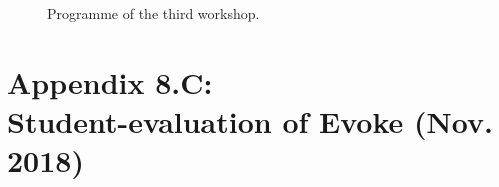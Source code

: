 \begin{figure}[htbp!]
\centering
{}
\caption{\label{fig:app:8.B:w3-programme}Programme of the third workshop.}
\end{figure}

\newpage
\section*{Appendix 8.C:\\Student-evaluation of Evoke (Nov. 2018)}
\label{Appendix8.C}

\begingroup
\renewcommand{\thefigure}{8.C.\arabic{figure}}
\setcounter{figure}{0}
\renewcommand{\thetable}{8.C.\arabic{table}}
\setcounter{table}{0}

